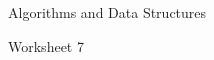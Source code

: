 \documentclass{article}
\begin{document}
    {Algorithms and Data Structures}

    \begin{center}
        \large
        Worksheet 7
    \end{center}
    \begin{tasks}
        \item 
        \item 
        \item 
        \item 
        \item 
    \end{tasks}
\end{document}
